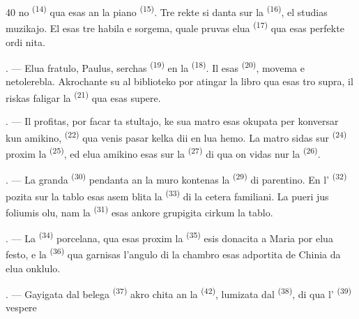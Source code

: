 \begin{VUpage}[42]{40}
\VUcontinue
no \textsuperscript{(14)} qua esas an la piano \textsuperscript{(15)}. Tre rekte si\cc
danta sur la  \textsuperscript{(16)}, el studias muzikajo.\nl
El esas tre habila e sorgema, quale pruvas\nl
elua  \textsuperscript{(17)} qua esas perfekte ordi\cc
nita.

\VUsaut{5.0mm}
\VUsaut{3.0mm}

. --- Elua fratulo, Paulus, serchas  \textsuperscript{(19)}\nl
en la  \textsuperscript{(18)}. Il esas  \textsuperscript{(20)}, movema\nl
e netolerebla. Akrochante su al biblioteko por\nl
atingar la libro qua esas tro supra, il riskas\nl
faligar la  \textsuperscript{(21)} qua esas supere.

. --- Il profitas, por facar ta stultajo, ke\nl
sua matro esas okupata per konversar kun\nl
amikino,  \textsuperscript{(22)} qua venis pasar kelka dii\nl
en lua hemo. La matro sidas sur  \textsuperscript{(24)}\nl
proxim la  \textsuperscript{(25)}, ed elua amikino esas sur\nl
la  \textsuperscript{(27)} di qua on vidas nur la \cc
{} \textsuperscript{(26)}.

. --- La granda  \textsuperscript{(30)} pendanta an la\nl
muro kontenas la  \textsuperscript{(29)} di parentino.\nl
En l' \textsuperscript{(32)} pozita sur la tablo esas asem\cc
blita la  \textsuperscript{(33)} di la cetera familiani.\nl
La pueri jus foliumis olu, nam la  \textsuperscript{(31)} esas\nl
ankore grupigita cirkum la tablo.

. --- La  \textsuperscript{(34)} porcelana, qua\nl
esas proxim la  \textsuperscript{(35)} esis donacita\nl
a Maria por elua festo, e la  \textsuperscript{(36)} qua\nl
garnisas l'angulo di la chambro esas adportita\nl
de Chinia da elua onklulo.

. --- Gayigata dal belega  \textsuperscript{(37)} akro\cc
chita an la  \textsuperscript{(42)}, lumizata dal \cc
{} \textsuperscript{(38)}, di qua l' \textsuperscript{(39)} vespere
\parplein
\end{VUpage}

